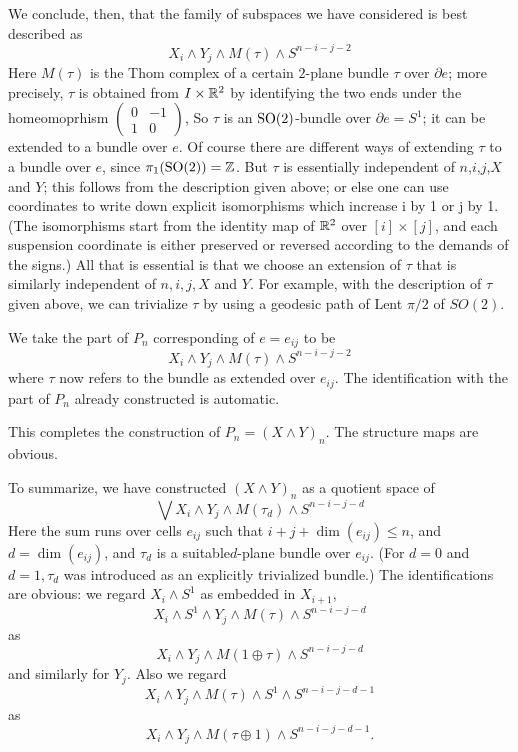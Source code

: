 \documentclass[../main]{subfiles}
\begin{document}
We conclude, then, that the family of subspaces we have considered is best described as 
\[X_i\wedge Y_j\wedge M(\tau) \wedge S^{n-i-j-2} \]
Here $M(\tau)$ is the Thom complex of a certain $2$-plane bundle $\tau$ over $\partial e$; more precisely, $\tau$ is obtained from $I\times \mathbb{R}^2$ by identifying the two ends under the homeomoprhism $\begin{pmatrix}0&-1\\ 1&0 \end{pmatrix}$, So $\tau$ is an $\mathrm{SO}(2)$-bundle over $\partial e=S^1$; it can be extended to a bundle over $e$. Of course there are different ways of extending $\tau$ to a bundle over $e$, since $\pi_1(\mathrm{SO}(2))=\mathbb{Z}$. But $\tau$ is essentially independent of $n$,$i$,$j$,$X$ and $Y$;
this follows from the description given above; or else one can use
coordinates to write down explicit isomorphisms which increase i by 1
 or j by 1. (The isomorphisms start from the identity map of $\mathbb{R}^2$ over $[i]\times [j]$, and each suspension coordinate is either preserved or reversed
according to the demands of the signs.) All that is essential is that we
choose an extension of $\tau$ that is similarly independent of $n,i,j,X$ and $Y$. For example, with the description of $\tau$ given above, we can trivialize $\tau$ by using a geodesic path of Lent $\pi/2$ of $SO(2)$.

We take the part of $P_n$ corresponding of $e=e_{ij}$ to be \[X_i\wedge Y_j \wedge M(\tau) \wedge S^{n-i-j-2}\]
where $\tau$ now refers to the bundle as extended over $e_{ij}$. The identification with the part of $P_n$ already constructed is automatic. 

This completes the construction of $P_n=(X\wedge Y)_n$. The structure maps are obvious.

To summarize, we have constructed $(X\wedge Y)_n$ as a quotient space of \[\bigvee X_i\wedge Y_j \wedge M(\tau_d)\wedge S^{n-i-j-d}\]
Here the sum runs over cells $e_{ij}$ such that $i+j+\dim(e_{ij})\leq n$, and $d=\dim(e_{ij})$, and $\tau_d$ is a suitable$d$-plane bundle over $e_{ij}$. (For $d=0$ and $d=1,\tau_d$ was introduced as an explicitly trivialized bundle.) The identifications are obvious: we regard $X_i\wedge S^1$ as embedded in $X_{i+1}$,
\[X_i\wedge S^1 \wedge Y_j \wedge M(\tau) \wedge S^{n-i-j-d} \]
as
\[X_i\wedge Y_j\wedge M(1\oplus \tau) \wedge S^{n-i-j-d} \]
and similarly for $Y_j$. Also we regard
\[X_i\wedge Y_j\wedge M(\tau)\wedge S^1\wedge S^{n-i-j-d-1}\]
as
\[X_i\wedge Y_j\wedge M(\tau\oplus 1)\wedge S^{n-i-j-d-1}.\]
\end{document}
